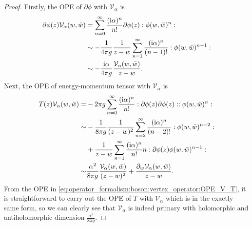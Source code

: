 \documentclass[10pt]{article}
\newcommand{\ii}{\mathrm{i}}
\begin{document}
\begin{proof}
    Firstly, the OPE of $\partial\phi$ with $\mathcal{V}_\alpha$ is
    \begin{align}
        \partial\phi(z)\mathcal{V}_\alpha(w,\bar{w})&=\sum_{n=0}^\infty\frac{(\ii\alpha)^n}{n!}\partial\phi(z):\phi(w,\bar{w})^n:\notag\\
                                                    &\sim-\frac{1}{4\pi g}\frac{1}{z-w}\sum_{n=1}^{\infty}\frac{(\ii\alpha)^n}{(n-1)!}:\phi(w,\bar{w})^{n-1}:\notag\\
                                                    &\sim-\frac{\ii\alpha}{4\pi g}\frac{\mathcal{V}_\alpha(w,\bar{w})}{z-w}.
    \end{align}
    Next, the OPE of energy-momentum tensor with $\mathcal{V}_\alpha$ is 
    \begin{align}
        T(z)\mathcal{V}_\alpha(w,\bar{w})=&-2\pi g\sum_{n=0}^{\infty}\frac{(\ii\alpha)^n}{n!}:\partial\phi(z)\partial\phi(z)::\phi(w,\bar{w})^n:\notag\\
                                        \sim&-\frac{1}{8\pi g}\frac{1}{(z-w)^2}\sum_{n=2}^{\infty}\frac{(\ii\alpha)^n}{(n-2)!}:\phi(w,\bar{w})^{n-2}:\notag\\
                                        &+\frac{1}{z-w}\sum_{n=1}^{\infty}\frac{(\ii\alpha)^n}{n!}n:\partial\phi(z)\phi(w,\bar{w})^{n-1}:\notag\\
                                        \sim&\frac{\alpha^2}{8\pi g}\frac{\mathcal{V}_\alpha(w,\bar{w})}{(z-w)^2}+\frac{\partial_w\mathcal{V}_\alpha(w,\bar{w})}{z-w}.\label{eq:operator_formalism:boson:vertex_operator:OPE_V_T}
    \end{align}
    From the OPE in \cref{eq:operator_formalism:boson:vertex_operator:OPE_V_T}, it is straightforward to carry out the OPE of $\bar{T}$ with $\mathcal{V}_\alpha$ which is in the exactly same form, so we can clearly see that $\mathcal{V}_\alpha$ is indeed primary with holomorphic and antiholomorphic dimension $\frac{\alpha^2}{8\pi g}$. 
\end{proof}
\end{document}
